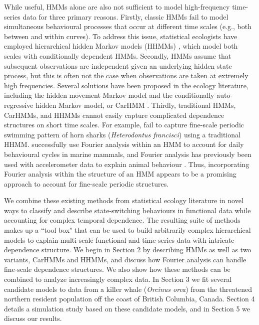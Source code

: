 While useful, HMMs alone are also not sufficient to model high-frequency time-series data for three primary reasons.
Firstly, classic HMMs fail to model simultaneous behavioural processes that occur at different time scales (e.g., both between and within curves). To address this issue, statistical ecologists have employed hierarchical hidden Markov models (HHMMs) \citep{Barajas:2017,Adam:2019}, which model both scales with conditionally dependent HMMs.
Secondly, HMMs assume that subsequent observations are independent given an underlying hidden state process, but this is often not the case when observations are taken at extremely high frequencies. Several solutions have been proposed in the ecology literature, including the hidden movement Markov model \citep{Whoriskey:2016} and the conditionally auto-regressive hidden Markov model, or CarHMM \citep{Lawler:2019}. 
Thirdly, traditional HMMs, CarHMMs, and HHMMs cannot easily capture complicated dependence structures on short time scales. For example, \citet{Adam:2019} fail to capture fine-scale periodic swimming pattern of horn sharks (\textit{Heterodontus francisci}) using a traditional HHMM. \citet{Heerah:2017} successfully use Fourier analysis within an HMM to account for daily behavioural cycles in marine mammals, and Fourier analysis has previously been used with accelerometer data to explain animal behaviour \citep{Fehlmann:2017,Shorter:2017}. Thus, incorporating Fourier analysis within the structure of an HMM appears to be a promising approach to account for fine-scale periodic structures.

We combine these existing methods from statistical ecology literature in novel ways to classify and describe state-switching behaviours in functional data while accounting for complex temporal dependence. The resulting suite of methods makes up a ``tool box" that can be used to build arbitrarily complex hierarchical models to explain multi-scale functional and time-series data with intricate dependence structure.
We begin in Section 2 by describing HMMs as well as two variants, CarHMMs and HHMMs, and discuss how Fourier analysis can handle fine-scale dependence structures. We also show how these methods can be combined to analyze increasingly complex data. In Section 3 we fit several candidate models to data from a killer whale (\textit{Orcinus orca}) from the threatened northern resident population off the coast of British Columbia, Canada. Section 4 details a simulation study based on these candidate models, and in Section 5 we discuss our results.